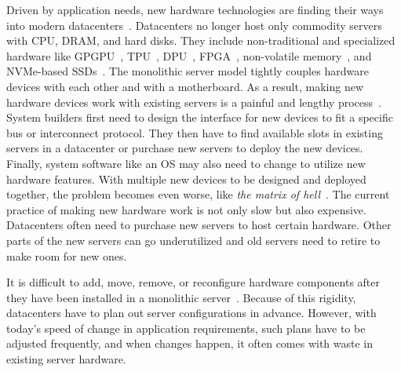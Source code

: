 \documentclass[10pt,times,twocolumn]{z2-article}
\begin{document}
Driven by application needs, new hardware technologies are finding their ways into modern datacenters~\cite{sigarch-dc}.
Datacenters no longer host only commodity servers with CPU, DRAM, and hard disks. 
They include non-traditional and specialized hardware like GPGPU~\cite{GPU-google,GPU-aws}, 
TPU~\cite{TPU}, 
DPU~\cite{DPU},
FPGA~\cite{Putnam14-FPGA,Amazon-F1,SmartNIC-nsdi18},
non-volatile memory~\cite{Intel3DXpoint,facebook-eurosys18},
and NVMe-based SSDs~\cite{everspin}.
%
The monolithic server model tightly couples hardware devices with each other and with a motherboard.
As a result, making new hardware devices work with existing servers is a painful and lengthy process~\cite{Putnam14-FPGA}.
System builders first need to design the interface for new devices to fit a specific bus or interconnect protocol.
They then have to find available slots in existing servers in a datacenter 
or purchase new servers to deploy the new devices.
Finally, system software like an OS may also need to change to utilize new hardware features.
\fi
With multiple new devices to be designed and deployed together, 
the problem becomes even worse, like {\em the matrix of hell}~\cite{Docker-PAAS}.
%
The current practice of making new hardware work is not only slow but also expensive.
Datacenters often need to purchase new servers to host certain hardware.
Other parts of the new servers can go underutilized 
and old servers need to retire to make room for new ones.

It is difficult to add, move, remove, or reconfigure hardware components
after they have been installed in a monolithic server~\cite{FB-Wedge100}. %
Because of this rigidity, datacenters have to plan out server configurations in advance.
However, with today's speed of change in application requirements, such plans have to be adjusted frequently,
and when changes happen, it often comes with waste in existing server hardware.
\end{document}
